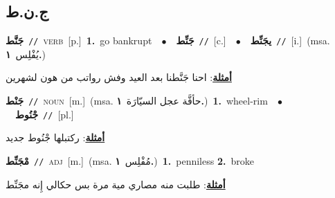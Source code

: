 \documentclass[10pt,a4paper,twoside]{article} %
\begin{document}
\begin{multicols}{2}
\vspace{-3mm}
\subsection*{\color{blue}\foreignlanguage{arabic}{ج.ن.ط}\color{blue}{}} 

{\setlength\topsep{0pt}\textbf{\foreignlanguage{arabic}{جَنَّط}}\ {\color{gray}\texttt{//}\color{black}}\ \textsc{verb}\ [p.]\ \textbf{1.}~go bankrupt\ \ $\bullet$\ \ \setlength\topsep{0pt}\textbf{\foreignlanguage{arabic}{جَنِّط}}\ {\color{gray}\texttt{//}\color{black}}\ [c.]\ \ $\bullet$\ \ \setlength\topsep{0pt}\textbf{\foreignlanguage{arabic}{يجَنِّط}}\ {\color{gray}\texttt{//}\color{black}}\ [i.]\ \color{gray}(msa. \foreignlanguage{arabic}{يُفْلِس}~\foreignlanguage{arabic}{\textbf{١.}})\color{black}\  \begin{flushright}\color{gray}\foreignlanguage{arabic}{\textbf{\underline{\foreignlanguage{arabic}{أمثلة}}}: احنا جَنَّطنا بعد العيد وفش رواتب من هون لشهرين}\end{flushright}\color{black}} \vspace{2mm}

{\setlength\topsep{0pt}\textbf{\foreignlanguage{arabic}{جَنْط}}\ {\color{gray}\texttt{//}\color{black}}\ \textsc{noun}\ [m.]\ \color{gray}(msa. \foreignlanguage{arabic}{حأفَّة عجل السيّارَة}~\foreignlanguage{arabic}{\textbf{١.}})\color{black}\ \textbf{1.}~wheel-rim\ \ $\bullet$\ \ \setlength\topsep{0pt}\textbf{\foreignlanguage{arabic}{جْنُوط}}\ {\color{gray}\texttt{//}\color{black}}\ [pl.]\  \begin{flushright}\color{gray}\foreignlanguage{arabic}{\textbf{\underline{\foreignlanguage{arabic}{أمثلة}}}: ركتبلها جْنُوط جديد}\end{flushright}\color{black}} \vspace{2mm}

{\setlength\topsep{0pt}\textbf{\foreignlanguage{arabic}{مْجَنِّط}}\ {\color{gray}\texttt{//}\color{black}}\ \textsc{adj}\ [m.]\ \color{gray}(msa. \foreignlanguage{arabic}{مُفْلِس}~\foreignlanguage{arabic}{\textbf{١.}})\color{black}\ \textbf{1.}~penniless  \textbf{2.}~broke\  \begin{flushright}\color{gray}\foreignlanguage{arabic}{\textbf{\underline{\foreignlanguage{arabic}{أمثلة}}}: طلبت منه مصاري مية مرة بس حكالي إِنه مجَنِّط}\end{flushright}\color{black}} \vspace{2mm}


\end{multicols}
\end{document}
